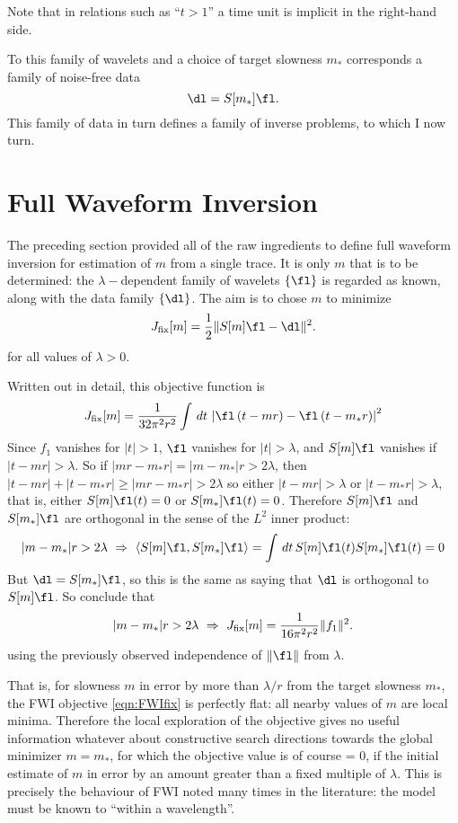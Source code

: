 Note that in relations such as ``$t>1$'' a time unit is implicit in
the right-hand side.

To this family of wavelets and a choice of target slowness $m_*$  corresponds a family of noise-free data
\begin{equation}
  \label{eqn:defdata}
  \dl=S[m_*]\fl.
\end{equation}
This family of data in turn defines a family of inverse problems, to
which I now turn.

\section{Full Waveform Inversion}
The preceding section provided all of the raw ingredients to define
full waveform inversion for estimation of $m$ from a single trace.
It is only $m$ that is to be determined: the $\lambda-$dependent family of wavelets
$\{\fl\}$ is regarded as known, along with the data family $\{\dl\}$. The aim
is to chose $m$ to minimize 
\begin{equation}
  \label{eqn:FWIfix}
  J_{\rm fix}[m] = \frac{1}{2}\|S[m]\fl-\dl\|^2.
\end{equation}
for all values of $\lambda > 0$.

Written out in detail, this objective function is
\[
 J_{\rm fix}[m] =  \frac{1}{32\pi^2
    r^2}\int\,dt\,\left|\fl\left(t-mr\right)-\fl\left(t-m_*r\right)\right|^2
\]
Since $f_1$ vanishes for $|t|>1$, $\fl$ vanishes for $|t|>\lambda$,
and $S[m]\fl$ vanishes if $|t-mr|>\lambda$. So if $|mr-m_*r|
= |m-m_*|r > 2\lambda$, then $|t-mr|+|t-m_*r| \ge |mr-m_*r| >
2\lambda$ so either $|t-mr|>\lambda$ or $|t-m_*r|>\lambda$, that is,
either $S[m]\fl(t)=0$ or $S[m_*]\fl(t)=0$. Therefore $S[m]\fl$ and
$S[m_*]\fl$ are orthogonal in the sense of the $L^2$ inner product:
\begin{equation}
  \label{eqn:ortho}
  |m- m_*|r > 2\lambda \,\, \Rightarrow \,\, \langle S[m]\fl,
  S[m_*]\fl\rangle = \int\,dt\,S[m]\fl(t)S[m_*]\fl(t) = 0
\end{equation}
But $\dl = S[m_*]\fl$, so this is the same as saying that $\dl$ is
orthogonal to $S[m]\fl$. So conclude that
\begin{equation}
  \label{eqn:iso}
  |m- m_*|r > 2\lambda \,\, \Rightarrow \,\, J_{\rm fix}[m]=\frac{1}{16\pi^2
    r^2}\|f_1\|^2.
\end{equation}
using the previously observed independence of $\|\fl\|$ from
$\lambda$.

That is, for slowness $m$ in error by more than $\lambda/r$ from the
target slowness $m_*$, the FWI objective \ref{eqn:FWIfix} is perfectly
flat: all nearby values of $m$ are local minima. Therefore the local
exploration of the objective
gives no useful information whatever about constructive search
directions towards the global minimizer $m=m_*$, for which the
objective value is of course = 0, if the initial estimate of $m$ in
error by an amount greater than a fixed multiple of $\lambda$. This is
precisely the behaviour of FWI noted many times in the literature: the
model must be known to ``within a wavelength''. 

